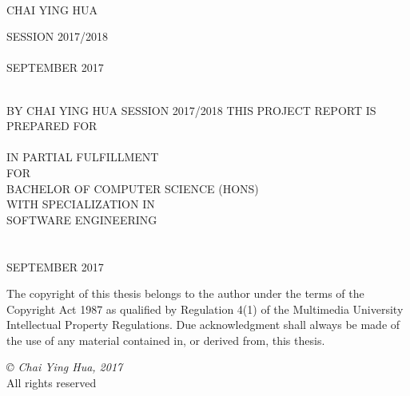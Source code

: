 \documentclass[12pt, oneside]{Thesis}
\begin{document}
\begin{titlepage}
\begin{center}

{\LARGE \ttitle}\\[0.4cm] 
\vfill
\Large{CHAI YING HUA} 

\vfill
\normalsize{SESSION 2017/2018}
\vfill
\normalsize\FACNAME\\
\normalsize \UNIVNAME\\
{\normalsize SEPTEMBER 2017}\\ 
\vfill
\end{center}

\end{titlepage}
\thispagestyle{empty}
\begin{center}

	{\LARGE \ttitle}\\[0.4cm] %
	\vfill
	\footnotesize{BY}
	\vfill
	\Large{CHAI YING HUA} %
	\vfill
	\footnotesize{SESSION 2017/2018}
	\vfill
	\footnotesize{THIS PROJECT REPORT IS PREPARED FOR}
	\vfil
	\normalsize\FACNAME\\
	\normalsize \UNIVNAME\\
	\normalsize{IN PARTIAL FULFILLMENT}\\
	\normalsize{FOR}\\
	\vfil
	\normalsize{BACHELOR OF COMPUTER SCIENCE (HONS)}\\
	\normalsize{WITH SPECIALIZATION IN}\\
	\normalsize{SOFTWARE ENGINEERING}\\
	\vfil
	\normalsize\FACNAME\\
	\vfil
	\Large \UNIVNAME\\
	\vfil
	{\normalsize SEPTEMBER 2017}\\ %
	\vfill
\end{center}

\newpage
\thispagestyle{empty}

The copyright of this thesis belongs to the author under the terms of the Copyright Act 1987 as qualified by Regulation 4(1) of the Multimedia University Intellectual Property Regulations. Due acknowledgment shall always be made of the use of any material contained in, or derived from, this thesis. 

\vfil
\textit{© Chai Ying Hua, 2017}\\
All rights reserved
\end{document}
